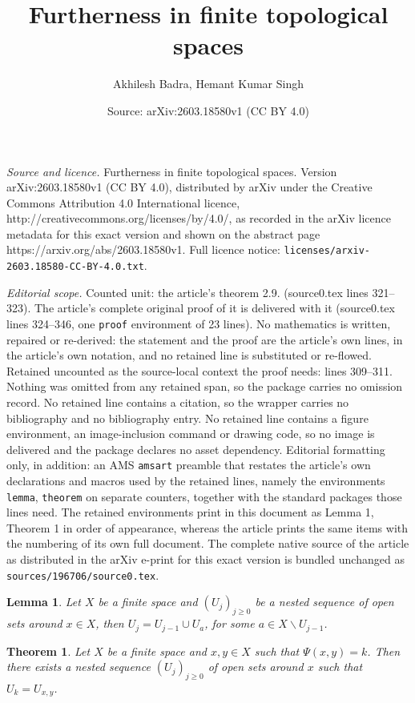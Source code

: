 \documentclass[10pt,a4paper]{amsart}
\title{Furtherness in finite topological spaces}
\author{Akhilesh Badra, Hemant Kumar Singh}
\date{Source: arXiv:2603.18580v1 (CC BY 4.0)}
\newtheorem{lemma}{Lemma}
\newtheorem{theorem}{Theorem}
\begin{document}
\maketitle

\noindent\emph{Source and licence.} Furtherness in finite topological spaces. Version arXiv:2603.18580v1 (CC BY 4.0), distributed by arXiv under the Creative Commons Attribution 4.0 International licence, http://creativecommons.org/licenses/by/4.0/, as recorded in the arXiv licence metadata for this exact version and shown on the abstract page https://arxiv.org/abs/2603.18580v1. Full licence notice: \texttt{licenses/arxiv-2603.18580-CC-BY-4.0.txt}.\par\smallskip

\noindent\textit{Editorial scope.} Counted unit: the article's theorem 2.9. (source0.tex lines 321--323). The article's complete original proof of it is delivered with it (source0.tex lines 324--346, one \texttt{proof} environment of 23 lines). No mathematics is written, repaired or re-derived: the statement and the proof are the article's own lines, in the article's own notation, and no retained line is substituted or re-flowed.  Retained uncounted as the source-local context the proof needs: lines 309--311.  Nothing was omitted from any retained span, so the package carries no omission record.  No retained line contains a citation, so the wrapper carries no bibliography and no bibliography entry.  No retained line contains a figure environment, an image-inclusion command or drawing code, so no image is delivered and the package declares no asset dependency.  Editorial formatting only, in addition: an AMS \texttt{amsart} preamble that restates the article's own declarations and macros used by the retained lines, namely the environments \texttt{lemma}, \texttt{theorem} on separate counters, together with the standard packages those lines need.  The retained environments print in this document as Lemma 1, Theorem 1 in order of appearance, whereas the article prints the same items with the numbering of its own full document.  The complete native source of the article as distributed in the arXiv e-print for this exact version is bundled unchanged as \texttt{sources/196706/source0.tex}.
\begin{lemma}\label{2.8.}
	Let $X$ be a finite space and $(U_j)_{j\geq0}$ be a nested sequence of open sets around $x\in X$, then $U_j= U_{j-1}\cup U_a$, for some $a\in X\backslash U_{j-1}$.
\end{lemma}

\begin{theorem}\label{2.9.}
	Let $X$ be a finite space and $x,y\in X$ such that $\Psi(x,y)=k$. Then there exists a nested sequence $(U_j)_{j\geq 0}$ of open sets around $x$ such that $U_k=U_{x,y}$.
\end{theorem}
\end{document}
